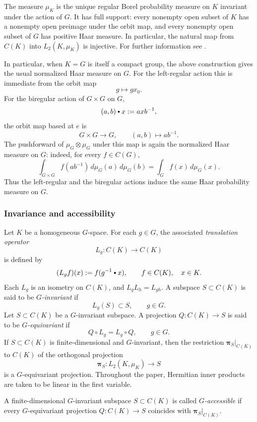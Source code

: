 \documentclass[11pt,showkeys]{amsart}
\newcommand{\hbullet}{\mathbin{\vcenter{\hbox{\scalebox{0.7}{$\bullet$}}}}}
\begin{document}
The measure $\mu_K$ is the unique regular Borel probability measure on $K$ invariant under
the action of $G$.
It has full support: every nonempty open subset of $K$ has a nonempty open preimage under the orbit map, and every nonempty open subset of $G$ has positive Haar measure. In particular, the natural map from $C(K)$ into $L_2(K,\mu_K)$ is injective.
For further information  see \cite{diestel2014joys}.

In particular, when \(K=G\) is itself a compact group, the above construction
gives the usual normalized Haar measure on \(G\). For the left-regular action
this is immediate from the orbit map
\[
        g\longmapsto gx_0 .
\]
For the biregular action of \(G\times G\) on \(G\),
\[
        (a,b)\hbullet x:=axb^{-1},
\]
the orbit map based at \(e\) is
\[
        G\times G\longrightarrow G,
        \qquad
        (a,b)\longmapsto ab^{-1}.
\]
The pushforward of \(\mu_G\otimes\mu_G\) under this map is again the
normalized Haar measure on \(G\): indeed, for every \(f\in C(G)\),
\[
        \int_{G\times G} f(ab^{-1})\,d\mu_G(a)\,d\mu_G(b)
        =
        \int_G f(x)\,d\mu_G(x).
\]
Thus the left-regular and the biregular actions induce the same Haar
probability measure on \(G\).


\subsubsection{Invariance and accessibility}
Let \(K\) be a homogeneous \(G\)-space. For each \(g\in G\), the associated
\emph{translation operator}
\[
L_g\colon C(K)\longrightarrow C(K)
\]
is defined by
\[
(L_g f)(x):=f(g^{-1}\hbullet x),
\qquad f\in C(K),\quad x\in K.
\]
Each \(L_g\) is an isometry on \(C(K)\), and \(L_gL_h=L_{gh}\). 
A subspace \(S\subset C(K)\) is said to be \emph{\(G\)-invariant} if
\[
L_g(S)\subset S,\qquad g\in G.
\]
Let \(S\subset C(K)\) be a \(G\)-invariant subspace. A projection
\(
Q\colon C(K)\longrightarrow S
\)
is said to be \emph{\(G\)-equivariant} if
\[
Q\circ L_g=L_g\circ Q,\qquad g\in G.
\]
If \(S\subset C(K)\) is finite-dimensional and \(G\)-invariant, then the
restriction \(\mathbf\pi_S|_{C(K)}\) to \(C(K)\) of the orthogonal projection
\[
\mathbf\pi_S\colon L_2(K,\mu_K)\longrightarrow S
\]
is a \(G\)-equivariant projection. Throughout the paper, Hermitian inner
products are taken to be linear in the first variable.

A finite-dimensional \(G\)-invariant subspace \(S\subset C(K)\) is called
\emph{\(G\)-accessible} if every \(G\)-equivariant projection
\(
Q\colon C(K)\longrightarrow S
\)
coincides with \(\mathbf\pi_S|_{C(K)}\).
\end{document}
